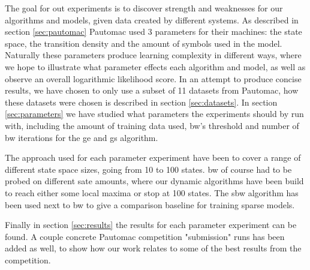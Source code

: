 The goal for out experiments is to discover strength and weaknesses for our algorithms and models, given data created by different systems. As described in section \ref{sec:pautomac} Pautomac used 3 parameters for their machines: the state space, the transition density and the amount of symbols used in the model. Naturally these parameters produce learning complexity in different ways, where we hope to illustrate what parameter effects each algorithm and model, as well as observe an overall logarithmic likelihood score. In an attempt to produce concise results, we have chosen to only use a subset of 11 datasets from Pautomac, how these datasets were chosen is described in section \ref{sec:datasets}. In section \ref{sec:parameters} we have studied what parameters the experiments should by run with, including the amount of training data used, \gls{bw}'s threshold and number of \gls{bw} iterations for the \gls{ge} and \gls{gs} algorithm. 

The approach used for each parameter experiment have been to cover a range of different state space sizes, going from 10 to 100 states. \gls{bw} of course had to be probed on different sate amounts, where our dynamic algorithms have been build to reach either some local maxima or stop at 100 states. The \gls{sbw} algorithm has been used next to \gls{bw} to give a comparison baseline for training sparse models.

Finally in section \ref{sec:results} the results for each parameter experiment can be found. A couple concrete Pautomac competition "submission" runs has been added as well, to show how our work relates to some of the best results from the competition.